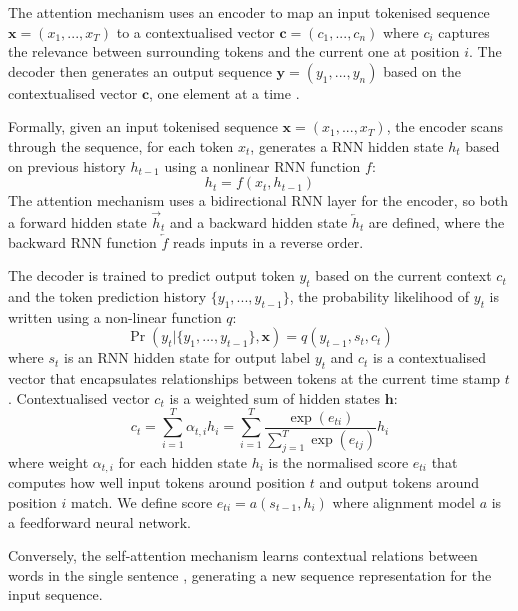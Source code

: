 The attention mechanism uses an encoder to map an input tokenised sequence $\textbf{x} = (x_1,...,x_T)$ to a contextualised vector $\textbf{c} = (c_1, ..., c_n)$ where $c_i$ captures the relevance between surrounding tokens and the current one at position $i$. The decoder then generates an output sequence $\textbf{y} = (y_1, ..., y_n)$ based on the contextualised vector $\textbf{c}$, one element at a time \cite{Vaswani17attention}. 

Formally, given an input tokenised sequence $\textbf{x} = (x_1,...,x_T)$, the encoder scans through the sequence, for each token $x_t$, generates a RNN hidden state $h_t$ based on previous history $h_{t-1}$ using a nonlinear RNN function $f$:
\begin{equation}
    h_t = f(x_t, h_{t-1})
\end{equation}
The attention mechanism uses a bidirectional RNN layer for the encoder, so both a forward hidden state $\overrightarrow{h}_t$ and a backward hidden state $\overleftarrow{h}_t$ are defined, where the backward RNN function $\overleftarrow{f}$ reads inputs in a reverse order.

The decoder is trained to predict output token $y_t$ based on the current context $c_t$ and the token prediction history $\{y_1, ..., y_{t-1}\}$, the probability likelihood of $y_t$ is written using a non-linear function $q$:
\begin{equation}
    \Pr(y_t| \{y_1, ..., y_{t-1}\}, \textbf{x}) = q(y_{t-1}, s_t, c_t)
\end{equation}
where $s_t$ is an RNN hidden state for output label $y_t$ and $c_t$ is a contextualised vector that encapsulates relationships between tokens at the current time stamp $t$. Contextualised vector $c_t$ is a weighted sum of hidden states $\textbf{h}$:
\begin{equation}
    c_t = \sum_{i=1}^T \alpha_{t,i}h_i = \sum_{i=1}^T \frac{\exp(e_{ti})}{\sum_{j=1}^T \exp(e_{tj})} h_i
\end{equation}
where weight $\alpha_{t,i}$ for each hidden state $h_i$ is the normalised score $e_{ti}$ that computes how well input tokens around position $t$ and output tokens around position $i$ match. We define score $e_{ti} = a(s_{t-1}, h_i)$ where alignment model $a$ is a feedforward neural network.

Conversely, the self-attention mechanism learns contextual relations between words in the single sentence  \cite{Vaswani17attention}, generating a new sequence representation for the input sequence.

